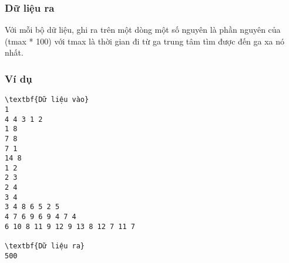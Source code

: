 \subsubsection{   Dữ liệu ra  }

   Với mỗi bộ dữ liệu, ghi ra trên một dòng một số nguyên là phần nguyên của (tmax * 100) với tmax là thời gian đi từ ga trung tâm tìm được đến ga xa nó nhất.  

\subsubsection{   Ví dụ  }
\begin{verbatim}
\textbf{Dữ liệu vào}
1
4 4 3 1 2
1 8
7 8
7 1
14 8
1 2
2 3
2 4
3 4
3 4 8 6 5 2 5
4 7 6 9 6 9 4 7 4
6 10 8 11 9 12 9 13 8 12 7 11 7	

\textbf{Dữ liệu ra}
500
\end{verbatim}

